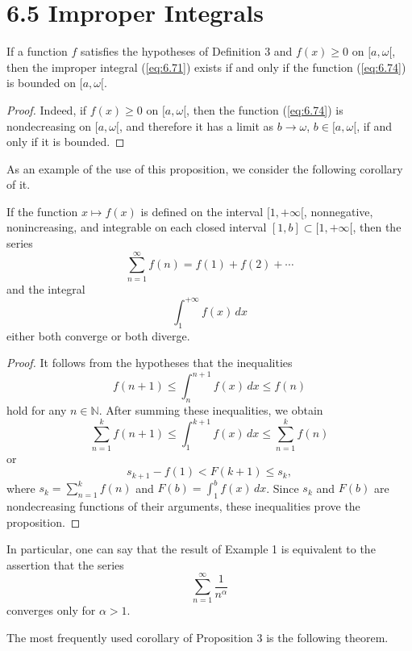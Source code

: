 \documentclass{article}
\begin{document}
\section*{6.5 Improper Integrals}

\begin{proposition}
If a function $f$ satisfies the hypotheses of Definition 3 and $f(x) \geq 0$ on $[a, \omega[$, then the improper integral (\ref{eq:6.71}) exists if and only if the function (\ref{eq:6.74}) is bounded on $[a, \omega[$.
\end{proposition}

\begin{proof}
Indeed, if $f(x) \geq 0$ on $[a, \omega[$, then the function (\ref{eq:6.74}) is nondecreasing on $[a, \omega[$, and therefore it has a limit as $b \to \omega$, $b \in [a, \omega[$, if and only if it is bounded.
\end{proof}

As an example of the use of this proposition, we consider the following corollary of it.

\begin{corollary}
If the function $x \mapsto f(x)$ is defined on the interval $[1, +\infty[$, nonnegative, nonincreasing, and integrable on each closed interval $[1, b] \subset [1, +\infty[$, then the series
\[
\sum_{n=1}^{\infty} f(n) = f(1) + f(2) + \cdots
\]
and the integral
\[
\int_{1}^{+\infty} f(x) \, dx
\]
either both converge or both diverge.
\end{corollary}

\begin{proof}
It follows from the hypotheses that the inequalities
\[
f(n + 1) \leq \int_{n}^{n+1} f(x) \, dx \leq f(n)
\]
hold for any $n \in \mathbb{N}$. After summing these inequalities, we obtain
\[
\sum_{n=1}^{k} f(n + 1) \leq \int_{1}^{k+1} f(x) \, dx \leq \sum_{n=1}^{k} f(n)
\]
or
\[
s_{k+1} - f(1) < F(k + 1) \leq s_k,
\]
where $s_k = \sum_{n=1}^{k} f(n)$ and $F(b) = \int_{1}^{b} f(x) \, dx$. Since $s_k$ and $F(b)$ are nondecreasing functions of their arguments, these inequalities prove the proposition.
\end{proof}

In particular, one can say that the result of Example 1 is equivalent to the assertion that the series
\[
\sum_{n=1}^{\infty} \frac{1}{n^{\alpha}}
\]
converges only for $\alpha > 1$.

The most frequently used corollary of Proposition 3 is the following theorem.
\end{document}
